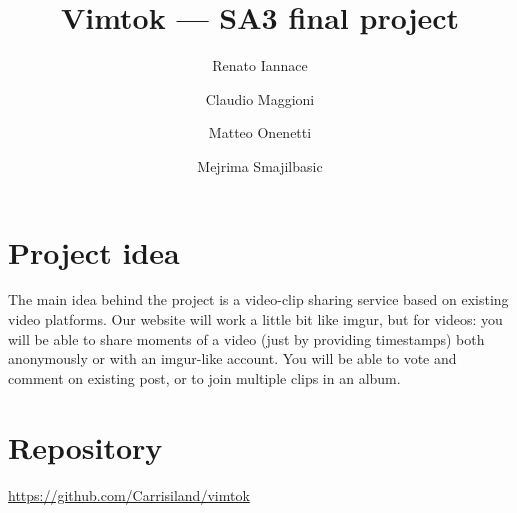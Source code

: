 \documentclass[a4paper]{article}
\title{Vimtok --- SA3 final project}
\author{Renato Iannace \and Claudio Maggioni \and Matteo Onenetti \and
Mejrima Smajilbasic}
\begin{document}
\maketitle

\section{Project idea}
The main idea behind the project is a video-clip sharing service based on
existing video platforms. Our website will work a little bit like imgur, but for
videos: you will be able to share moments of a video (just by providing
timestamps) both anonymously or with an imgur-like account. You will be able to
vote and comment on existing post, or to join multiple clips in an album.

\section{Repository}
\url{https://github.com/Carrisiland/vimtok}
\end{document}
